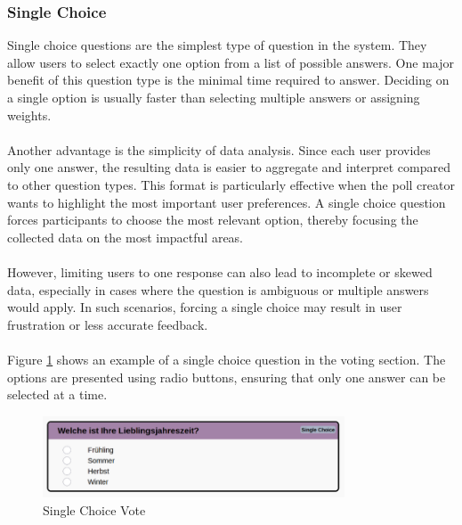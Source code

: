 \documentclass[a4paper,12pt]{report}
\begin{document}
\subsubsection{Single Choice}
Single choice questions are the simplest type of question in the system. They allow users to select exactly one option from a list of possible answers. One major benefit of this question type is the minimal time required to answer. Deciding on a single option is usually faster than selecting multiple answers or assigning weights. \\ \\
Another advantage is the simplicity of data analysis. Since each user provides only one answer, the resulting data is easier to aggregate and interpret compared to other question types. This format is particularly effective when the poll creator wants to highlight the most important user preferences. A single choice question forces participants to choose the most relevant option, thereby focusing the collected data on the most impactful areas. \\ \\
However, limiting users to one response can also lead to incomplete or skewed data, especially in cases where the question is ambiguous or multiple answers would apply. In such scenarios, forcing a single choice may result in user frustration or less accurate feedback. \cite{singlevsmultiple} \\ \\
Figure \ref{fig:singlechoice} shows an example of a single choice question in the voting section. The options are presented using radio buttons, ensuring that only one answer can be selected at a time.
\begin{figure}[H]	
	\centering	
	\includegraphics[width=0.8\textwidth]{pics/Single_Choice.png}	
	\caption{Single Choice Vote}	
	\label{fig:singlechoice}
\end{figure}
\end{document}
